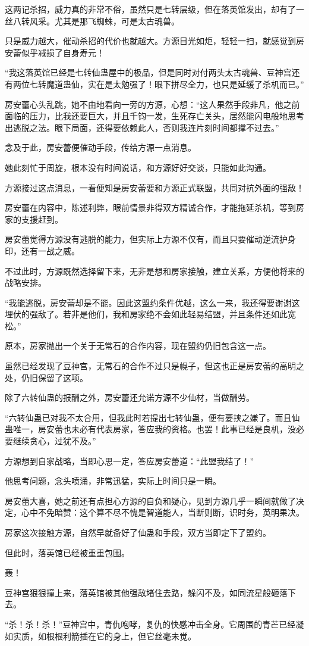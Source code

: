 \begin{this_body}
这两记杀招，威力真的非常不俗，虽然只是七转层级，但在落英馆发出，却有了一丝八转风采。尤其是那飞蜘蛛，可是太古魂兽。

只是威力越大，催动杀招的代价也就越大。方源目光如炬，轻轻一扫，就感觉到房安蕾似乎减损了自身寿元！

“我这落英馆已经是七转仙蛊屋中的极品，但是同时对付两头太古魂兽、豆神宫还有两位七转魔道蛊仙，实在是太勉强了！眼下拼尽全力，也只是延缓了杀机而已。”

房安蕾心头乱跳，她不由地看向一旁的方源，心想：“这人果然手段非凡，他之前面临的压力，比我还要巨大，并且千钧一发，生死存亡关头，居然能闪电般地思考出逃脱之法。眼下局面，还得要依赖此人，否则我连片刻时间都撑不过去。”

念及于此，房安蕾便催动手段，传给方源一点消息。

她此刻忙于周旋，根本没有时间说话，和方源好好交谈，只能如此沟通。

方源接过这点消息，一看便知是房安蕾要和方源正式联盟，共同对抗外面的强敌！

房安蕾在内容中，陈述利弊，眼前情景非得双方精诚合作，才能拖延杀机，等到房家的支援赶到。

房安蕾觉得方源没有逃脱的能力，但实际上方源不仅有，而且只要催动逆流护身印，还有一战之威。

不过此时，方源既然选择留下来，无非是想和房家接触，建立关系，方便他将来的战略安排。

“我能逃脱，房安蕾却是不能。因此这盟约条件优越，这么一来，我还得要谢谢这埋伏的强敌了。若非是他们，我和房家绝不会如此轻易结盟，并且条件还如此宽松。”

原本，房家抛出一个关于无常石的合作内容，现在盟约仍旧包含这一点。

虽然已经发现了豆神宫，无常石的合作不过只是幌子，但这也正是房安蕾的高明之处，仍旧保留了这项。

除了六转仙蛊的报酬之外，房安蕾还允诺方源不少仙材，当做酬劳。

“六转仙蛊已对我不太合用，但我此时若提出七转仙蛊，便有要挟之嫌了。而且仙蛊唯一，房安蕾也未必有代表房家，答应我的资格。也罢！此事已经是良机，没必要继续贪心，过犹不及。”

方源想到自家战略，当即心思一定，答应房安蕾道：“此盟我结了！”

他思考问题，念头喷涌，非常迅猛，实际上时间只是一瞬。

房安蕾大喜，她之前还有点担心方源的自负和疑心，见到方源几乎一瞬间就做了决定，心中不免暗赞：这个算不尽不愧是智道能人，当断则断，识时务，英明果决。

房家这次接触方源，自然早就备好了仙蛊和手段，双方当即定下了盟约。

但此时，落英馆已经被重重包围。

轰！

豆神宫狠狠撞上来，落英馆被其他强敌堵住去路，躲闪不及，如同流星般砸落下去。

“杀！杀！杀！”豆神宫中，青仇咆哮，复仇的快感冲击全身。它周围的青芒已经凝如实质，如根根利箭插在它的身上，但它丝毫未觉。

\end{this_body}

